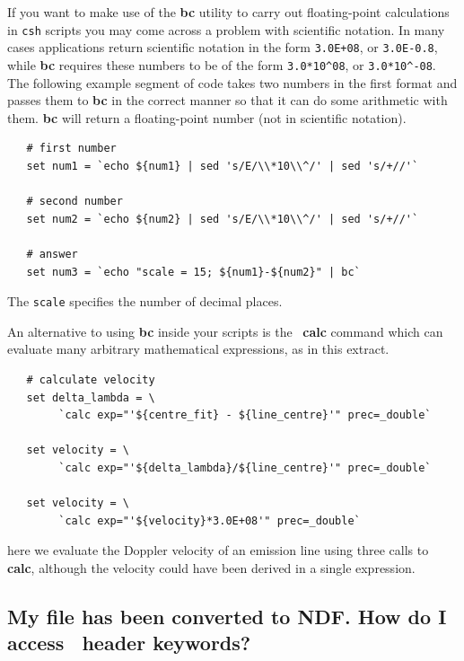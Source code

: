 \documentclass[twoside,11pt]{article}
\newcommand{\xref}[3]{#1}
\newcommand{\xlabel}[1]{}
\begin{document}
\begin{\htmlonly}
{If you want to make use of the {\bf bc} utility to carry out
floating-point calculations in {\tt csh} scripts you may come across a
problem with scientific notation.  In many cases applications return
scientific notation in the form {\tt 3.0E+08}, or {\tt 3.0E-0.8},
while {\bf bc} requires these numbers to be of the form
\verb+3.0*10^08+, or \verb+3.0*10^-08+.  The following example segment
of code takes two numbers in the first format and passes them to {\bf
bc} in the correct manner so that it can do some arithmetic with them.
{\bf bc} will return a floating-point number (not in scientific
notation).

\small\begin{verbatim}
   # first number
   set num1 = `echo ${num1} | sed 's/E/\\*10\\^/' | sed 's/+//'`
   
   # second number
   set num2 = `echo ${num2} | sed 's/E/\\*10\\^/' | sed 's/+//'`
   
   # answer
   set num3 = `echo "scale = 15; ${num1}-${num2}" | bc`
\end{verbatim}\normalsize

The {\tt scale} specifies the number of decimal places.

An alternative to using {\bf bc} inside your scripts is the \KAPPA\
\xref{{\bf calc}}{sun95}{CALC} command which can evaluate many arbitrary
mathematical expressions, as in this extract.

\small\begin{verbatim}
   # calculate velocity
   set delta_lambda = \
        `calc exp="'${centre_fit} - ${line_centre}'" prec=_double`

   set velocity = \
        `calc exp="'${delta_lambda}/${line_centre}'" prec=_double`

   set velocity = \
        `calc exp="'${velocity}*3.0E+08'" prec=_double`
\end{verbatim}\normalsize

here we evaluate the Doppler velocity of an emission line using three calls 
to {\bf calc}, although the velocity could have been derived in a single
expression.

\subsection{\xlabel{sc16_fitsheader}My file has been converted to NDF.
How do I access \FITSref\ header keywords?\label{sc16_fitsheader}}

}
\end{\htmlonly}
\end{document}
